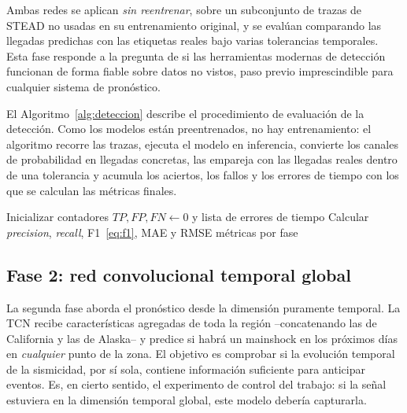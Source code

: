 Ambas redes se aplican \emph{sin reentrenar}, sobre un subconjunto de trazas de STEAD no usadas
en su entrenamiento original, y se evalúan comparando las llegadas predichas con las etiquetas
reales bajo varias tolerancias temporales. Esta fase responde a la pregunta de si las
herramientas modernas de detección funcionan de forma fiable sobre datos no vistos, paso previo
imprescindible para cualquier sistema de pronóstico.

El Algoritmo~\ref{alg:deteccion} describe el procedimiento de evaluación de la detección. Como
los modelos están preentrenados, no hay entrenamiento: el algoritmo recorre las trazas, ejecuta
el modelo en inferencia, convierte los canales de probabilidad en llegadas concretas, las
empareja con las llegadas reales dentro de una tolerancia y acumula los aciertos, los fallos y
los errores de tiempo con los que se calculan las métricas finales.

\begin{algorithm}[ht!]
  \caption{Evaluación de la detección y \textit{picking} de fases}
  \label{alg:deteccion}
  \DontPrintSemicolon
  Inicializar contadores $TP, FP, FN \leftarrow 0$ y lista de errores de tiempo\;
  Calcular \textit{precision}, \textit{recall}, F1~\eqref{eq:f1}, MAE y RMSE\;
  \Return métricas por fase\;
\end{algorithm}

\subsection{Fase 2: red convolucional temporal global}
\label{dev-tcn}

La segunda fase aborda el pronóstico desde la dimensión puramente temporal. La TCN recibe
características agregadas de toda la región --concatenando las de California y las de Alaska--
y predice si habrá un mainshock en los próximos días en \emph{cualquier} punto de la zona. El
objetivo es comprobar si la evolución temporal de la sismicidad, por sí sola, contiene
información suficiente para anticipar eventos. Es, en cierto sentido, el experimento de
control del trabajo: si la señal estuviera en la dimensión temporal global, este modelo
debería capturarla.

